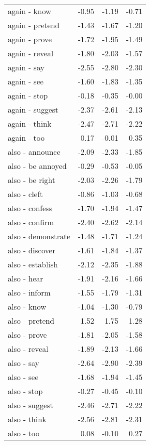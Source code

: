 \begin{longtable}{lrrr}
  again - know & -0.95 & -1.19 & -0.71 \\ 
  again - pretend & -1.43 & -1.67 & -1.20 \\ 
  again - prove & -1.72 & -1.95 & -1.49 \\ 
  again - reveal & -1.80 & -2.03 & -1.57 \\ 
  again - say & -2.55 & -2.80 & -2.30 \\ 
  again - see & -1.60 & -1.83 & -1.35 \\ 
  again - stop & -0.18 & -0.35 & -0.00 \\ 
  again - suggest & -2.37 & -2.61 & -2.13 \\ 
  again - think & -2.47 & -2.71 & -2.22 \\ 
  again - too & 0.17 & -0.01 & 0.35 \\ 
  also - announce & -2.09 & -2.33 & -1.85 \\ 
  also - be annoyed & -0.29 & -0.53 & -0.05 \\ 
  also - be right & -2.03 & -2.26 & -1.79 \\ 
  also - cleft & -0.86 & -1.03 & -0.68 \\ 
  also - confess & -1.70 & -1.94 & -1.47 \\ 
  also - confirm & -2.40 & -2.62 & -2.14 \\ 
  also - demonstrate & -1.48 & -1.71 & -1.24 \\ 
  also - discover & -1.61 & -1.84 & -1.37 \\ 
  also - establish & -2.12 & -2.35 & -1.88 \\ 
  also - hear & -1.91 & -2.16 & -1.66 \\ 
  also - inform & -1.55 & -1.79 & -1.31 \\ 
  also - know & -1.04 & -1.30 & -0.79 \\ 
  also - pretend & -1.52 & -1.75 & -1.28 \\ 
  also - prove & -1.81 & -2.05 & -1.58 \\ 
  also - reveal & -1.89 & -2.13 & -1.66 \\ 
  also - say & -2.64 & -2.90 & -2.39 \\ 
  also - see & -1.68 & -1.94 & -1.45 \\ 
  also - stop & -0.27 & -0.45 & -0.10 \\ 
  also - suggest & -2.46 & -2.71 & -2.22 \\ 
  also - think & -2.56 & -2.81 & -2.31 \\ 
  also - too & 0.08 & -0.10 & 0.27 \\ 

\end{longtable}
